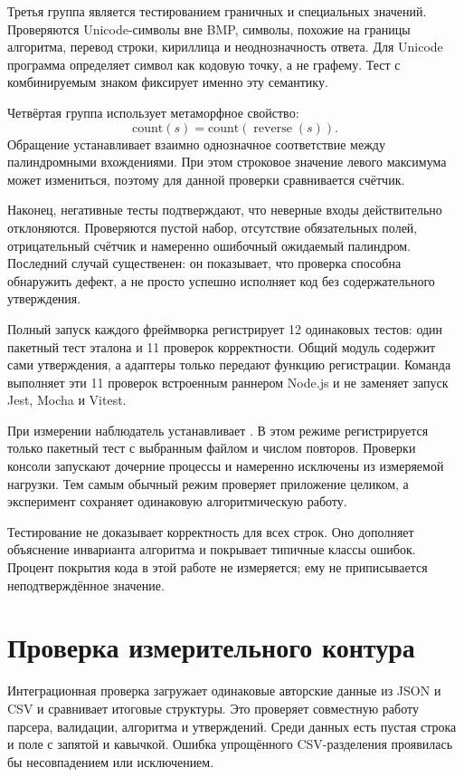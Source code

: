 Третья группа является тестированием граничных и специальных значений. Проверяются Unicode-символы вне BMP, символы, похожие на границы алгоритма, перевод строки, кириллица и неоднозначность ответа. Для Unicode программа определяет символ как кодовую точку, а не графему. Тест с комбинируемым знаком фиксирует именно эту семантику.

Четвёртая группа использует метаморфное свойство:
\[
 \mathrm{count}(s)=\mathrm{count}(\operatorname{reverse}(s)).
\]
Обращение устанавливает взаимно однозначное соответствие между палиндромными вхождениями. При этом строковое значение левого максимума может измениться, поэтому для данной проверки сравнивается счётчик.

Наконец, негативные тесты подтверждают, что неверные входы действительно отклоняются. Проверяются пустой набор, отсутствие обязательных полей, отрицательный счётчик и намеренно ошибочный ожидаемый палиндром. Последний случай существенен: он показывает, что проверка способна обнаружить дефект, а не просто успешно исполняет код без содержательного утверждения.

Полный запуск каждого фреймворка регистрирует 12 одинаковых тестов: один пакетный тест эталона и 11 проверок корректности. Общий модуль содержит сами утверждения, а адаптеры только передают функцию регистрации. Команда  выполняет эти 11 проверок встроенным раннером Node.js и не заменяет запуск Jest, Mocha и Vitest.

При измерении наблюдатель устанавливает . В этом режиме регистрируется только пакетный тест с выбранным файлом и числом повторов. Проверки консоли запускают дочерние процессы и намеренно исключены из измеряемой нагрузки. Тем самым обычный режим проверяет приложение целиком, а эксперимент сохраняет одинаковую алгоритмическую работу.

Тестирование не доказывает корректность для всех строк. Оно дополняет объяснение инварианта алгоритма и покрывает типичные классы ошибок. Процент покрытия кода в этой работе не измеряется; ему не приписывается неподтверждённое значение.

\section{Проверка измерительного контура}
Интеграционная проверка загружает одинаковые авторские данные из JSON и CSV и сравнивает итоговые структуры. Это проверяет совместную работу парсера, валидации, алгоритма и утверждений. Среди данных есть пустая строка и поле с запятой и кавычкой. Ошибка упрощённого CSV-разделения проявилась бы несовпадением или исключением.

